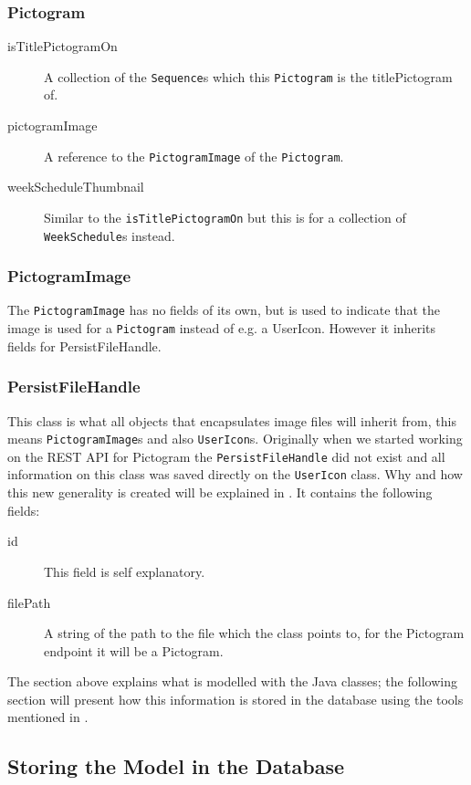 \subsubsection*{Pictogram}
	\begin{description}
		\item[isTitlePictogramOn] A collection of the \texttt{Sequence}s which this \texttt{Pictogram} is the titlePictogram of.
		\item[pictogramImage] A reference to the \texttt{PictogramImage} of the \texttt{Pictogram}.
		\item[weekScheduleThumbnail] Similar to the \texttt{isTitlePictogramOn} but this is for a collection of \texttt{WeekSchedule}s instead.
	\end{description}

\subsubsection*{PictogramImage}
The \texttt{PictogramImage} has no fields of its own, but is used to indicate that the image is used for a \texttt{Pictogram} instead of e.g. a UserIcon.
However it inherits fields for PersistFileHandle.

\subsubsection*{PersistFileHandle}
This class is what all objects that encapsulates image files will inherit from, this means \texttt{PictogramImage}s and also \texttt{UserIcon}s.
Originally when we started working on the REST API for Pictogram the \texttt{PersistFileHandle} did not exist and all information on this class was saved directly on the \texttt{UserIcon} class.
Why and how this new generality is created will be explained in .
It contains the following fields:
\begin{description}
	\item[id] This field is self explanatory.
	\item[filePath] A string of the path to the file which the class points to, for the Pictogram endpoint it will be a Pictogram.
\end{description}

The section above explains what is modelled with the Java classes; the following section will present how this information is stored in the database using the tools mentioned in .

\subsection{Storing the Model in the Database}

